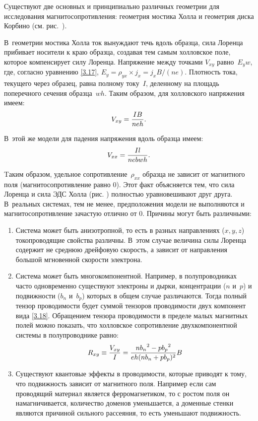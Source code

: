 Существуют две основных и принципиально различных геометрии для исследования
магнитосопротивления: геометрия
мостика Холла и геометрия диска Корбино (см. рис.~).

В~геометрии мостика Холла ток вынуждают течь вдоль образца, сила Лоренца
прибивает носители к краю образца, создавая тем самым холловское поле, которое
компенсирует силу Лоренца. Напряжение между точками $V_{xy}$ равно~$E_yw$, где,
согласно уравнению \eqref{3.17}, $E_y=\rho_{yx}\times j_x=j_x B/(ne)$. Плотность
тока, текущего через образец, равна полному току~$I$, деленному на площадь
поперечного сечения образца~$wh$. Таким образом, для холловского напряжения
имеем:
\begin{equation}
	V_{xy}=\frac{IB}{neh}.
	\eqmark{3.19}
\end{equation}

В~этой же модели для падения напряжения вдоль образца имеем:
\begin{equation}
	V_{xx}=\frac{Il}{nebwh}.
	\eqmark{3.20}
\end{equation}

Tаким образом, удельное сопротивление~$\rho_{xx}$ образца не зависит от
магнитного поля (магнитосопротивление равно 0). Этот факт объясняется тем, что
сила Лоренца и сила ЭДС Холла (рис. ) полностью
уравновешивают друг друга. В~реальных системах, тем не менее, предположения
модели не выполняются и магнитосопротивление зачастую отлично от 0. Причины
могут быть различными:
\begin{enumerate}
\item Система может быть анизотропной, то есть в разных направлениях ($x,y,z$)
токопроводящие свойства различны. В~этом случае величина силы Лоренца содержит
не среднюю дрейфовую скорость, а зависит от направления большой мгновенной
скорости электрона.

\item Система может быть многокомпонентной. Например, в полупроводниках часто
одновременно существуют электроны и дырки, концентрации ($n$ и~$p$) и
подвижности ($b_n$ и~$b_p$) которых в общем случае различаются. Тогда полный
тензор проводимости будет суммой тензоров проводимости двух компонент вида
\eqref{3.18}. Обращением тензора проводимости в пределе малых магнитных полей
можно показать, что холловское сопротивление двухкомпонентной системы в
полупроводнике равно:
\begin{equation}
	R_{xy}\equiv \frac{V_{xy}}{I}=\frac{n{b_n}^2-p{b_p}^2}{eh(nb_n+pb_p)^2}B
	\eqmark{3.21}
\end{equation}

\item Существуют квантовые эффекты в проводимости, которые приводят к тому, что
подвижность зависит от магнитного поля. Например если сам проводящий материал
является ферромагнетиком, то с ростом поля он намагничивается, количество
доменов уменьшается, а доменные стенки являются причиной сильного рассеяния, то
есть уменьшают подвижность.
\end{enumerate}

